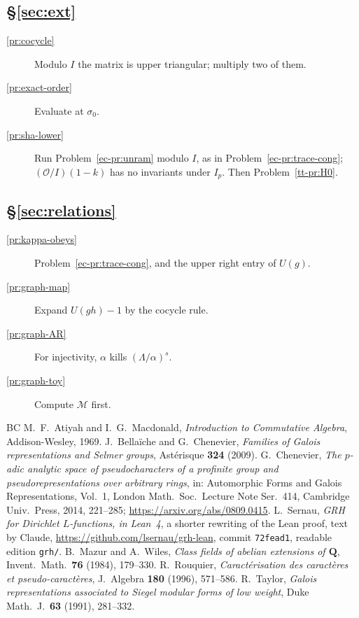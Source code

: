 \documentclass[reqno]{amsart}
\theoremstyle{definition}
\theoremstyle{plain}
\newcommand{\Oc}{\mathcal{O}}
\begin{document}
\subsection*{\S\ref{sec:ext}}
\begin{description}
\item[\ref{pr:cocycle}] Modulo \(I\) the matrix is upper triangular; multiply two of them.
\item[\ref{pr:exact-order}] Evaluate at \(\sigma_0\).
\item[\ref{pr:sha-lower}] Run Problem~\ref{ec-pr:unram} modulo \(I\), as in Problem~\ref{ec-pr:trace-cong}; \((\Oc/I)(1-k)\) has no invariants under \(I_p\).  Then Problem~\ref{tt-pr:H0}.
\end{description}

\subsection*{\S\ref{sec:relations}}
\begin{description}
\item[\ref{pr:kappa-obeys}] Problem~\ref{ec-pr:trace-cong}, and the upper right entry of \(U(g)\).
\item[\ref{pr:graph-map}] Expand \(U(gh) - 1\) by the cocycle rule.
\item[\ref{pr:graph-AR}] For injectivity, \(\alpha\) kills \((\Lambda/\alpha)^s\).
\item[\ref{pr:graph-toy}] Compute \(\mathcal{M}\) first.
\end{description}

\begin{thebibliography}{BC}
 M.~F.~Atiyah and I.~G.~Macdonald, \emph{Introduction to Commutative Algebra}, Addison-Wesley, 1969.
 J.~Bella\"iche and G.~Chenevier, \emph{Families of Galois representations and Selmer groups}, Ast\'erisque \textbf{324} (2009).
 G.~Chenevier, \emph{The \(p\)-adic analytic space of pseudocharacters of a profinite group and pseudorepresentations over arbitrary rings}, in: Automorphic Forms and Galois Representations, Vol.~1, London Math.\ Soc.\ Lecture Note Ser.\ 414, Cambridge Univ.\ Press, 2014, 221--285; \url{https://arxiv.org/abs/0809.0415}.
 L.~Sernau, \emph{GRH for Dirichlet \(L\)-functions, in Lean~4}, a shorter rewriting of the Lean proof, text by Claude, \url{https://github.com/lsernau/grh-lean}, commit \texttt{72fead1}, readable edition \texttt{grh/}.
 B.~Mazur and A.~Wiles, \emph{Class fields of abelian extensions of \(\mathbf{Q}\)}, Invent.\ Math.\ \textbf{76} (1984), 179--330.
 R.~Rouquier, \emph{Caract\'erisation des caract\`eres et pseudo-caract\`eres}, J.~Algebra \textbf{180} (1996), 571--586.
 R.~Taylor, \emph{Galois representations associated to Siegel modular forms of low weight}, Duke Math.\ J.\ \textbf{63} (1991), 281--332.
\end{thebibliography}
\end{document}

